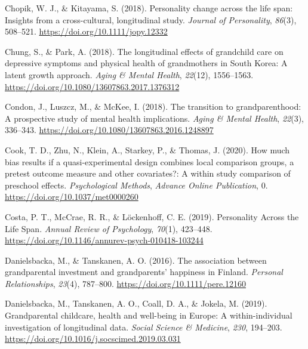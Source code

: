 \documentclass[
  english,
  man, noextraspace]{apa7}
\begin{document}
\leavevmode\hypertarget{ref-chopikPersonalityChangeLife2018}{}%
Chopik, W. J., \& Kitayama, S. (2018). Personality change across the life span: Insights from a cross-cultural, longitudinal study. \emph{Journal of Personality}, \emph{86}(3), 508--521. \url{https://doi.org/10.1111/jopy.12332}

\leavevmode\hypertarget{ref-chungLongitudinalEffectsGrandchild2018}{}%
Chung, S., \& Park, A. (2018). The longitudinal effects of grandchild care on depressive symptoms and physical health of grandmothers in South Korea: A latent growth approach. \emph{Aging \& Mental Health}, \emph{22}(12), 1556--1563. \url{https://doi.org/10.1080/13607863.2017.1376312}

\leavevmode\hypertarget{ref-condonTransitionGrandparenthoodProspective2018}{}%
Condon, J., Luszcz, M., \& McKee, I. (2018). The transition to grandparenthood: A prospective study of mental health implications. \emph{Aging \& Mental Health}, \emph{22}(3), 336--343. \url{https://doi.org/10.1080/13607863.2016.1248897}

\leavevmode\hypertarget{ref-cookHowMuchBias2020}{}%
Cook, T. D., Zhu, N., Klein, A., Starkey, P., \& Thomas, J. (2020). How much bias results if a quasi-experimental design combines local comparison groups, a pretest outcome measure and other covariates?: A within study comparison of preschool effects. \emph{Psychological Methods}, \emph{Advance Online Publication}, 0. \url{https://doi.org/10.1037/met0000260}

\leavevmode\hypertarget{ref-costaPersonalityLifeSpan2019}{}%
Costa, P. T., McCrae, R. R., \& Löckenhoff, C. E. (2019). Personality Across the Life Span. \emph{Annual Review of Psychology}, \emph{70}(1), 423--448. \url{https://doi.org/10.1146/annurev-psych-010418-103244}

\leavevmode\hypertarget{ref-danielsbackaAssociationGrandparentalInvestment2016}{}%
Danielsbacka, M., \& Tanskanen, A. O. (2016). The association between grandparental investment and grandparents' happiness in Finland. \emph{Personal Relationships}, \emph{23}(4), 787--800. \url{https://doi.org/10.1111/pere.12160}

\leavevmode\hypertarget{ref-danielsbackaGrandparentalChildcareHealth2019}{}%
Danielsbacka, M., Tanskanen, A. O., Coall, D. A., \& Jokela, M. (2019). Grandparental childcare, health and well-being in Europe: A within-individual investigation of longitudinal data. \emph{Social Science \& Medicine}, \emph{230}, 194--203. \url{https://doi.org/10.1016/j.socscimed.2019.03.031}
\end{document}
